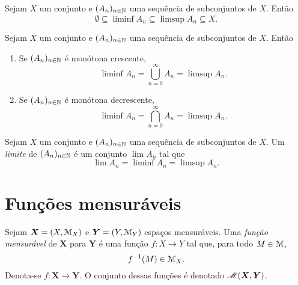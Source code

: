 \begin{proposition}
	Sejam $X$ um conjunto e $(A_n)_{n \in \mathbb{N}}$ uma sequência de subconjuntos de $X$. Então
	\begin{equation*}
	\emptyset \subseteq \liminf A_n \subseteq \limsup A_n \subseteq X.
	\end{equation*}
\end{proposition}

\begin{proposition}
	Sejam $X$ um conjunto e $(A_n)_{n \in \mathbb{N}}$ uma sequência de subconjuntos de $X$. Então
	\begin{enumerate}
	\item Se $(A_n)_{n \in \mathbb{N}}$ é monótona crescente,
	\begin{equation*}
	\liminf A_n = \bigcup_{n=0}^\infty A_n = \limsup A_n.
	\end{equation*}
	
	\item Se $(A_n)_{n \in \mathbb{N}}$ é monótona decrescente,
	\begin{equation*}
	\liminf A_n = \bigcap_{n=0}^\infty A_n = \limsup A_n.
	\end{equation*}
	\end{enumerate}
\end{proposition}

\begin{definition}
	Sejam $X$ um conjunto e $(A_n)_{n \in \mathbb{N}}$ uma sequência de subconjuntos de $X$. Um \emph{limite} de $(A_n)_{n \in \mathbb{N}}$ é um conjunto $\lim A_n$ tal que
	\begin{equation*}
	\lim A_n = \liminf A_n = \limsup A_n.
	\end{equation*}
\end{definition}


\section{Funções mensuráveis}

\begin{definition}
Sejam $\bm X = (X,\mathcal{M}_X)$ e $\bm Y = (Y,\mathcal{M}_Y)$ espaços mensuráveis. Uma \emph{função mensurável} de $\bm X$ para $\bm Y$ é uma função $f\colon X \to Y$ tal que, para todo $M \in \mathcal{M}$,
	\begin{equation*}
	f^{-1}(M) \in \mathcal{M}_X.
	\end{equation*}
Denota-se $f\colon \bm X \to \bm Y$. O conjunto dessas funções é denotado $\mathscr{M}(\bm X, \bm Y)$.
\end{definition}

